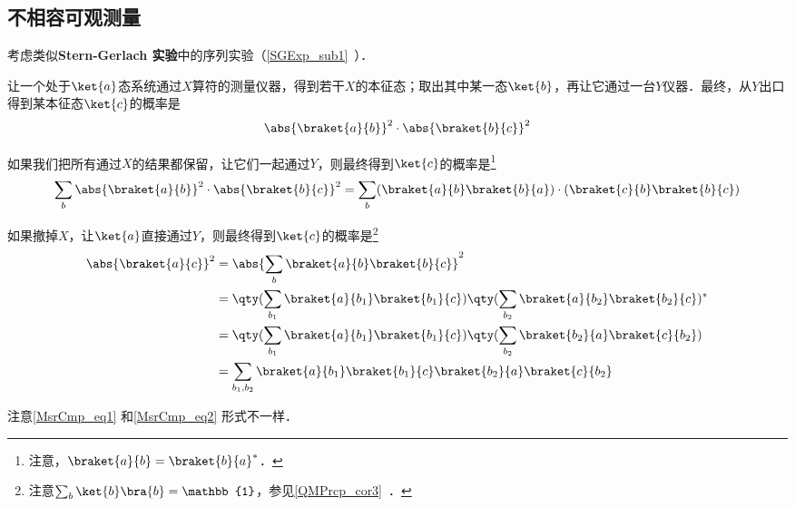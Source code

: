 \subsection{不相容可观测量}


考虑类似\textbf{Stern-Gerlach 实验}中的序列实验（\autoref{SGExp_sub1}~）．

让一个处于$\ket{a}$态系统通过$X$算符的测量仪器，得到若干$X$的本征态；取出其中某一态$\ket{b}$，再让它通过一台$Y$仪器．最终，从$Y$出口得到某本征态$\ket{c}$的概率是
\begin{equation}
\abs{\braket{a}{b}}^2\cdot\abs{\braket{b}{c}}^2
\end{equation}

如果我们把所有通过$X$的结果都保留，让它们一起通过$Y$，则最终得到$\ket{c}$的概率是\footnote{注意，$\braket{a}{b}=\braket{b}{a}^*$．}
\begin{equation}\label{MsrCmp_eq1}
\sum_{b}\abs{\braket{a}{b}}^2\cdot\abs{\braket{b}{c}}^2=\sum_{b}(\braket{a}{b}\braket{b}{a})\cdot(\braket{c}{b}\braket{b}{c})
\end{equation}

如果撤掉$X$，让$\ket{a}$直接通过$Y$，则最终得到$\ket{c}$的概率是\footnote{注意$\sum_{b}\ket{b}\bra{b}=\mathbb{1}$，参见\autoref{QMPrcp_cor3}~．}
\begin{equation}\label{MsrCmp_eq2}
\begin{aligned}
\abs{\braket{a}{c}}^2&=\abs{\sum_{b}\braket{a}{b}\braket{b}{c}}^2\\
&=\qty(\sum_{b_1}\braket{a}{b_1}\braket{b_1}{c})\qty(\sum_{b_2}\braket{a}{b_2}\braket{b_2}{c})^*\\
&=\qty(\sum_{b_1}\braket{a}{b_1}\braket{b_1}{c})\qty(\sum_{b_2}\braket{b_2}{a}\braket{c}{b_2})\\
&=\sum_{b_1, b_2}\braket{a}{b_1}\braket{b_1}{c}\braket{b_2}{a}\braket{c}{b_2}
\end{aligned}
\end{equation}

注意\autoref{MsrCmp_eq1} 和\autoref{MsrCmp_eq2} 形式不一样．




















